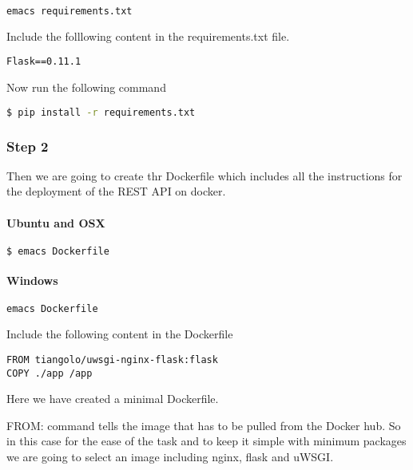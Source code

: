 \begin{lstlisting}[language=bash]
emacs requirements.txt
\end{lstlisting}

Include the folllowing content in the requirements.txt file.

\begin{lstlisting}
Flask==0.11.1
\end{lstlisting}

Now run the following command

\begin{lstlisting}[language=bash]
$ pip install -r requirements.txt
\end{lstlisting}

\subsubsection{Step 2}

Then we are going to create thr Dockerfile which includes all the
instructions for the deployment of the REST API on docker.

\paragraph{Ubuntu and OSX}

\begin{lstlisting}[language=bash]
$ emacs Dockerfile
\end{lstlisting}

\paragraph{Windows}

\begin{lstlisting}[language=bash]
emacs Dockerfile
\end{lstlisting}

Include the following content in the Dockerfile

\begin{lstlisting}
FROM tiangolo/uwsgi-nginx-flask:flask
COPY ./app /app
\end{lstlisting}

Here we have created a minimal Dockerfile.

FROM: command tells the image that has to be pulled from the Docker hub.
So in this case for the ease of the task and to keep it simple with
minimum packages we are going to select an image including nginx, flask
and uWSGI.

